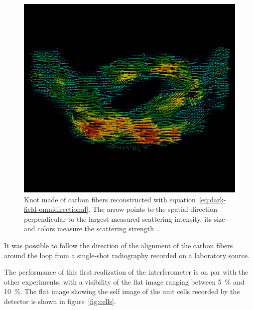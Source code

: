 \begin{figure}[htb]
    \centering
    \includegraphics[width=\textwidth]{gfx/omnidirectional/filtered.png}
    \caption{Knot made of carbon fibers reconstructed with
        equation~\eqref{eq:dark-field-omnidirectional}. The arrow points to
    the spatial direction perpendicular to the largest measured scattering
intensity, its size and colors measure the scattering
strength~\parencite{kagias2018omnidir}.}
    \label{fig:knot-reconstruction}
\end{figure}

It was possible to follow the direction of the alignment of the
carbon fibers around the loop from a single-shot radiography recorded on a
laboratory source.

The performance of this first realization of the interferometer is on par
with the other experiments, with a visibility of the flat image ranging
between \SI{5}{\percent} and \SI{10}{\percent}. The flat image showing the
self image of the unit cells recorded by the detector is shown in
figure~\ref{fig:cells}.

